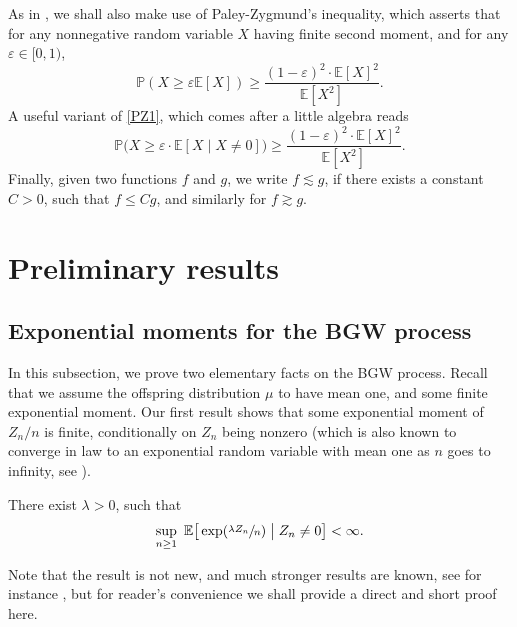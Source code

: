 As in \cite{AHJ}, we shall also make use of Paley-Zygmund's inequality, which asserts that for any nonnegative random variable $X$ having finite second moment,
and for any $\varepsilon \in [0,1)$,
\begin{equation}\label{PZ1}
\mathbb P(X\ge \varepsilon \mathbb E[X]) \ge \frac {(1-\varepsilon)^2\cdot \mathbb E[X]^2}{\mathbb E[X^2]}.
\end{equation}
A useful variant of \eqref{PZ1}, which comes after a little
algebra reads
\begin{equation}\label{PZ}
\mathbb P\big(X\ge \varepsilon\cdot \mathbb E[X\mid X\neq 0]\big) \ge \frac {(1-\varepsilon)^2\cdot \mathbb E[X]^2}{\mathbb E[X^2]}.
\end{equation}
Finally, given two functions $f$ and $g$, we write $f\lesssim g$, if there exists a constant $C>0$, such that $f\le Cg$, and similarly for $f\gtrsim g$.

\section{Preliminary results}\label{sec-prelim}
\subsection{Exponential moments for the BGW process}
In this subsection, we prove two elementary facts on the BGW process. Recall that we assume the offspring distribution $\mu$ to have mean one, and some finite exponential moment. Our first result shows that some exponential moment of $Z_n/n$ is finite, conditionally on $Z_n$ being nonzero
(which is also known to converge in law to an exponential random variable with mean one as $n$ goes to infinity, see \cite[Th.\,2 p.\,20]{AN}).
\begin{lemma}\label{lem.BGW}
There exist $\lambda>0$, such that
\begin{equation*}%
\sup_{n\ge 1} \ \mathbb E\big[\exp(\sfrac{\lambda Z_n}{n})\bigm| Z_n\neq 0\big] < \infty.
\end{equation*}
\end{lemma}
Note that the result is not new, and much stronger results are known, see for instance \cite{NV75,NV03}, but for reader's convenience
we shall provide a direct and short proof here.

